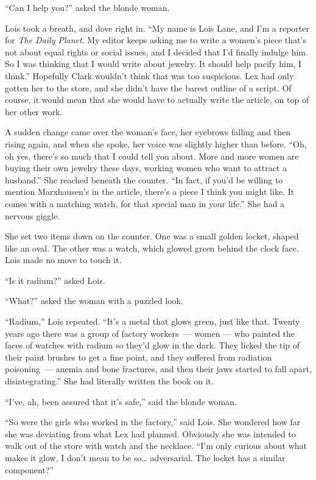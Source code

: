 ``Can I help you?'' asked the blonde woman.

Lois took a breath, and dove right in. ``My name is Lois Lane, and I'm a
reporter for \emph{The Daily Planet}. My editor keeps asking me to write
a women's piece that's not about equal rights or social issues, and I
decided that I'd finally indulge him. So I was thinking that I would
write about jewelry. It should help pacify him, I think.'' Hopefully
Clark wouldn't think that was too suspicious. Lex had only gotten her to
the store, and she didn't have the barest outline of a script. Of
course, it would mean that she would have to actually write the article,
on top of her other work.

A sudden change came over the woman's face, her eyebrows falling and
then rising again, and when she spoke, her voice was slightly higher
than before. ``Oh, oh yes, there's so much that I could tell you about.
More and more women are buying their own jewelry these days, working
women who want to attract a husband.'' She reached beneath the counter.
``In fact, if you'd be willing to mention Marxhausen's in the article,
there's a piece I think you might like. It comes with a matching watch,
for that special man in your life.'' She had a nervous giggle.

She set two items down on the counter. One was a small golden locket,
shaped like an oval. The other was a watch, which glowed green behind
the clock face. Lois made no move to touch it.

``Is it radium?'' asked Lois.

``What?'' asked the woman with a puzzled look.

``Radium,'' Lois repeated. ``It's a metal that glows green, just like
that. Twenty years ago there was a group of factory workers~--- women
--- who painted the faces of watches with radium so they'd glow in the
dark. They licked the tip of their paint brushes to get a fine point,
and they suffered from radiation poisoning~--- anemia and bone
fractures, and then their jaws started to fall apart, disintegrating.''
She had literally written the book on it.

``I've, ah, been assured that it's safe,'' said the blonde woman.

``So were the girls who worked in the factory,'' said Lois. She wondered
how far she was deviating from what Lex had planned. Obviously she was
intended to walk out of the store with watch and the necklace. ``I'm
only curious about what makes it glow, I don't mean to be so\ldots{}
adversarial. The locket has a similar component?''

